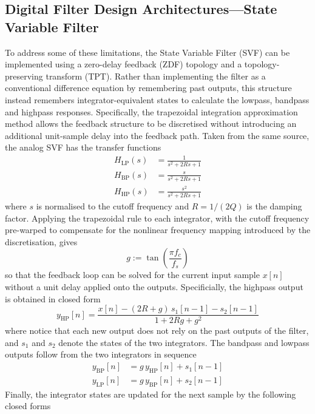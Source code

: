 \subsection{Digital Filter Design Architectures---State Variable Filter}
\noindent
To address some of these limitations, the State Variable Filter (SVF) can be implemented using a 
zero-delay feedback (ZDF) topology and a topology-preserving transform (TPT). Rather than implementing 
the filter as a conventional difference equation by remembering past outputs, this structure instead 
remembers integrator-equivalent states to 
calculate the lowpass, bandpass and highpass responses. Specifically, the trapezoidal integration 
approximation method allows the 
feedback structure to be discretised without introducing an additional unit-sample delay into the 
feedback path\cite{va_filter}.
Taken from the same source\cite{va_filter}, the analog SVF has the transfer functions
\begin{align}
	H_{\mathrm{LP}}(s) &= \frac{1}{s^{2} + 2Rs + 1}\\ 
  H_{\mathrm{BP}}(s) &= \frac{s}{s^{2} + 2Rs + 1} \\
	H_{\mathrm{HP}}(s) &= \frac{s^{2}}{s^{2} + 2Rs + 1}
\end{align}
where $s$ is normalised to the cutoff frequency and $R = 1/(2Q)$ is the damping factor. Applying the 
trapezoidal rule to each integrator, with the cutoff frequency pre-warped to compensate for the 
nonlinear frequency mapping introduced by the discretisation, gives
\begin{equation}
  g := \tan\!\left(\frac{\pi f_c}{f_s}\right)
\end{equation}
so that the feedback loop can be solved for the current input sample $x[n]$ without a unit delay 
applied onto 
the outputs. Specificially, the highpass output is
obtained in closed form
\begin{equation}
  y_{\mathrm{HP}}[n] = \frac{x[n] - (2R + g)\,s_1[n-1] - s_2[n-1]}{1 + 2Rg + g^{2}}
\end{equation}
where notice that each new output does not rely on the past outputs of the filter, and $s_1$ and $s_2$ 
denote the states of the two integrators. The bandpass and 
lowpass outputs follow from the two integrators in sequence
\begin{align}
  y_{\mathrm{BP}}[n] &= g\,y_{\mathrm{HP}}[n] + s_1[n-1] \\
  y_{\mathrm{LP}}[n] &= g\,y_{\mathrm{BP}}[n] + s_2[n-1]
\end{align}
Finally, the integrator states are updated for the next sample by the following closed forms
